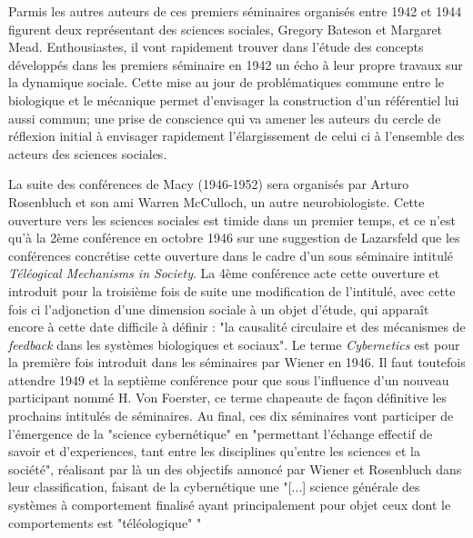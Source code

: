 Parmis les autres auteurs de ces premiers séminaires organisés entre 1942 et 1944 figurent deux représentant des sciences sociales, Gregory Bateson et Margaret Mead. Enthousiastes, il vont rapidement trouver dans l'étude des concepts développés dans les premiers séminaire en 1942 un écho à leur propre travaux sur la dynamique sociale. Cette mise au jour de problématiques commune entre le biologique et le mécanique permet d'envisager la construction d'un référentiel lui aussi commun; une prise de conscience qui va amener les auteurs du cercle de réflexion initial à envisager rapidement l'élargissement de celui ci  à l'ensemble des acteurs des sciences sociales.

La suite des conférences de Macy (1946-1952) sera organisés par Arturo Rosenbluch et son ami Warren McCulloch, un autre neurobiologiste. Cette ouverture vers les sciences sociales est timide dans un premier temps, et ce n'est qu'à la 2ème conférence en octobre 1946 sur une suggestion de Lazarsfeld que les conférences concrétise cette ouverture dans le cadre d'un sous séminaire intitulé \textit{Téléogical Mechanisms in Society}. La 4ème conférence acte cette ouverture et introduit pour la troisième fois de suite une modification de l'intitulé, avec cette fois ci l'adjonction d'une dimension sociale à un objet d'étude, qui apparaît encore à cette date difficile à définir : "la causalité circulaire et des mécanismes de \textit{feedback} dans les systèmes biologiques et sociaux". Le terme \textit{Cybernetics} est pour la première fois introduit dans les séminaires par Wiener en 1946. Il faut toutefois attendre 1949 et la septième conférence pour que sous l'influence d'un nouveau participant nommé H. Von Foerster, ce terme chapeaute de façon définitive les prochains intitulés de séminaires. Au final, ces dix séminaires vont participer de l'émergence de la "science cybernétique" en "permettant l'échange effectif de savoir et d'experiences, tant entre les disciplines qu'entre les sciences et la société", réalisant par là un des objectifs annoncé par Wiener et Rosenbluch dans leur classification, faisant de la cybernétique une "[...] science générale des systèmes à comportement finalisé ayant principalement pour objet ceux dont le comportements est "téléologique" " \autocite[]{Pouvreau2013}

